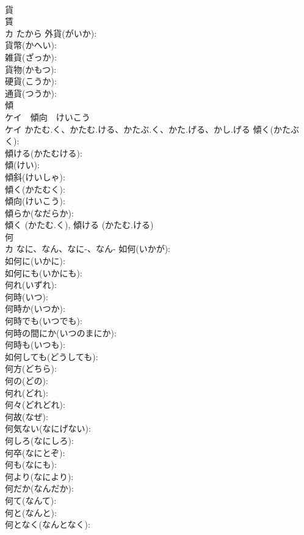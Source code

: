 \documentclass[8pt]{extreport}
\begin{document}
\begin{CJK}{UTF8}{min}
\\	貨			
\\	賃 
\\	カ	たから	外貨(がいか): 
\\	貨幣(かへい): 
\\	雑貨(ざっか): 
\\	貨物(かもつ): 
\\	硬貨(こうか): 
\\	通貨(つうか): 
\\	傾			
\\	ケイ　傾向　けいこう
\\	ケイ	かたむ.く、かたむ.ける、かたぶ.く、かた.げる、かし.げる	傾く(かたぶく): 
\\	傾ける(かたむける): 
\\	傾(けい): 
\\	傾斜(けいしゃ): 
\\	傾く(かたむく): 
\\	傾向(けいこう): 
\\	傾らか(なだらか): 
\\	傾く (かたむ.く), 傾ける (かたむ.ける)
\\	何			
\\	カ	なに、なん、なに-、なん-	如何(いかが): 
\\	如何に(いかに): 
\\	如何にも(いかにも): 
\\	何れ(いずれ): 
\\	何時(いつ): 
\\	何時か(いつか): 
\\	何時でも(いつでも): 
\\	何時の間にか(いつのまにか): 
\\	何時も(いつも): 
\\	如何しても(どうしても): 
\\	何方(どちら): 
\\	何の(どの): 
\\	何れ(どれ): 
\\	何々(どれどれ): 
\\	何故(なぜ): 
\\	何気ない(なにげない): 
\\	何しろ(なにしろ): 
\\	何卒(なにとぞ): 
\\	何も(なにも): 
\\	何より(なにより): 
\\	何だか(なんだか): 
\\	何て(なんて): 
\\	何と(なんと): 
\\	何となく(なんとなく): 

\end{CJK}
\end{document}
